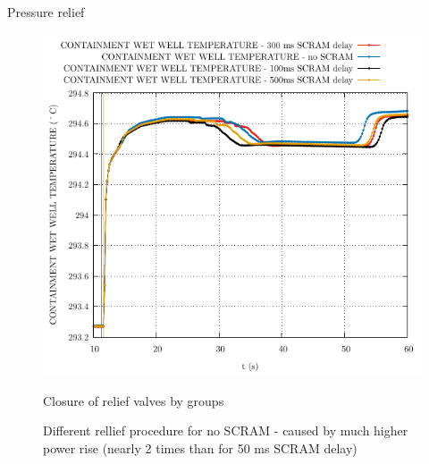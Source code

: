 \begin{frame}{Pressure relief}
\begin{figure}
\begin{minipage}{.5\textwidth}
			\centering
			\includegraphics[width=0.7\linewidth]{./graphs/CONTAINMENT WET WELL TEMPERATURE_comp.pdf}
		\end{minipage}%
		\begin{minipage}{.5\textwidth}
			\begin{itemize}
				\small{
				\item Closure of relief valves by groups
				\item Different rellief procedure for no SCRAM - caused by much higher power rise (nearly 2 times than for 50 ms SCRAM delay)}
			\end{itemize}
		\end{minipage}
	\end{figure}
\end{frame}

